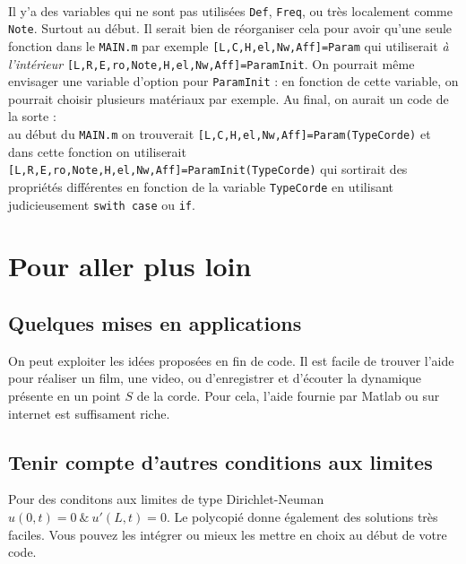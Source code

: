 \documentclass[a4paper,10pt]{article}
\begin{document}
\\
Il y'a des variables qui ne sont pas utilisées \verb"Def", \verb"Freq", ou très localement comme \verb"Note". Surtout au début. Il serait bien de réorganiser cela pour avoir qu'une seule fonction dans le \verb"MAIN.m" par exemple  \verb"[L,C,H,el,Nw,Aff]=Param" qui utiliserait \emph{à l'intérieur} \verb"[L,R,E,ro,Note,H,el,Nw,Aff]=ParamInit". On pourrait même envisager une variable d'option pour \verb"ParamInit" : en fonction de cette variable, on pourrait choisir plusieurs matériaux par exemple. Au final, on aurait un code de la sorte : \\ 
au début du \verb"MAIN.m" on trouverait  
\verb"[L,C,H,el,Nw,Aff]=Param(TypeCorde)" et dans cette fonction on utiliserait \\ \verb"[L,R,E,ro,Note,H,el,Nw,Aff]=ParamInit(TypeCorde)" qui sortirait des propriétés différentes en fonction de la variable \verb"TypeCorde" en utilisant judicieusement \verb"swith case" ou \verb"if". 

\section{Pour aller plus loin}

\subsection{Quelques mises en applications}
On peut exploiter les idées proposées en fin de code. Il est facile de trouver l'aide pour réaliser un film, une video, ou d'enregistrer et d'écouter la dynamique présente en un point $S$ de la corde. Pour cela, l'aide fournie par Matlab ou sur internet est suffisament riche. 

\subsection{Tenir compte d'autres conditions aux limites}
Pour des conditons aux limites de type Dirichlet-Neuman $u(0,t)=0 \ \& \ u'(L,t)=0$. Le polycopié donne également des solutions très faciles. Vous pouvez les intégrer ou mieux les mettre en choix au début de votre code. 

\end{document}
